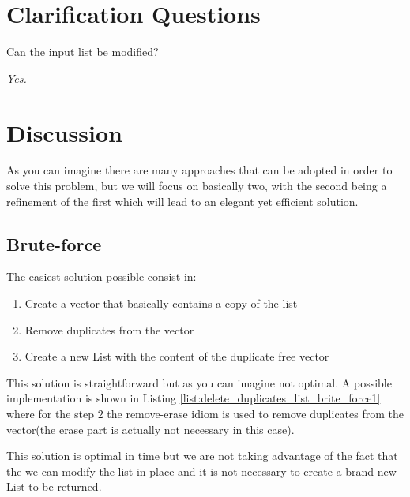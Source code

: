 \section{Clarification Questions}

\begin{QandA}
	\item Can the input list be modified?
	\begin{answered}
		\textit{Yes.}
	\end{answered}
	
\end{QandA}

\section{Discussion}
\label{delete_duplicates_list:sec:discussion}
As you can imagine there are many approaches that can be adopted in order to solve this problem, but we will focus on basically two, with the second being a refinement of the first which will lead to an elegant yet efficient solution.

\subsection{Brute-force}
\label{delete_duplicates_list:sec:bruteforce}
The easiest solution possible consist in:
\begin{enumerate}
	\item Create a vector that basically contains a copy of the list
	\item Remove duplicates from the vector
	\item Create a new List with the content of the duplicate free vector
\end{enumerate}
This solution is straightforward but as you can imagine not optimal. A possible implementation is shown in Listing \ref{list:delete_duplicates_list_brite_force1} where for the step $2$ the  remove-erase idiom\cite{cit::wiki::remove-erase} is used to remove duplicates from the vector(the erase part is actually not necessary in this case).



This solution is optimal in time but we are not taking advantage of the fact that the we can modify the list in place and it is not necessary to create a brand new List to be returned. 

